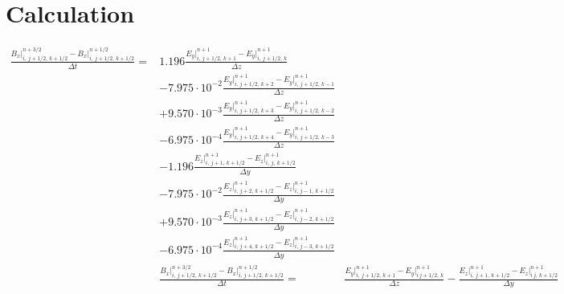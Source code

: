 \documentclass[bachelor_thesis]{subfiles}
\begin{document}
\appendix
\chapter{Calculation} \label{chap:numMaxwell}
\begin{align}
\frac{{B}_x\rvert_{i,\, j+1/2,\, k+1/2}^{n+3/2} - {B}_x\rvert_{i,\, j+1/2,\, k+1/2}^{n+1/2}}{\Delta t}
	 =& 1.196 \frac{{E}_y\rvert_{i,\, j+1/2,\, k+1}^{n+1} - {E}_y\rvert_{i,\, j+1/2,\, k}^{n+1}}{\Delta z}\\&
	 - 7.975\cdot 10^{-2} \frac{{E}_y\rvert_{i,\, j+1/2,\, k+2}^{n+1} - {E}_y\rvert_{i,\, j+1/2,\, k-1}^{n+1}}{\Delta z}\\&
	 + 9.570\cdot 10^{-3} \frac{{E}_y\rvert_{i,\, j+1/2,\, k+3}^{n+1} - {E}_y\rvert_{i,\, j+1/2,\, k-2}^{n+1}}{\Delta z}\\&
	 - 6.975\cdot 10^{-4} \frac{{E}_y\rvert_{i,\, j+1/2,\, k+4}^{n+1} - {E}_y\rvert_{i,\, j+1/2,\, k-3}^{n+1}}{\Delta z}\\&
	- 1.196 \frac{{E}_z\rvert_{i,\, j+1,\, k+1/2}^{n+1} - {E}_z\rvert_{i,\, j,\, k+1/2}^{n+1}}{\Delta y}\\&
	- 7.975\cdot 10^{-2} \frac{{E}_z\rvert_{i,\, j+2,\, k+1/2}^{n+1} - {E}_z\rvert_{i,\, j-1,\, k+1/2}^{n+1}}{\Delta y}\\&
	 + 9.570\cdot 10^{-3} \frac{{E}_z\rvert_{i,\, j+3,\, k+1/2}^{n+1} - {E}_z\rvert_{i,\, j-2,\, k+1/2}^{n+1}}{\Delta y}\\&
	 - 6.975\cdot 10^{-4} \frac{{E}_z\rvert_{i,\, j+4,\, k+1/2}^{n+1} - {E}_z\rvert_{i,\, j-3,\, k+1/2}^{n+1}}{\Delta y}\\&
	 
 
	\frac{{B}_x\rvert_{i,\, j+1/2,\, k+1/2}^{n+3/2} - {B}_x\rvert_{i,\, j+1/2,\, k+1/2}^{n+1/2}}{\Delta t} 
	 =& \frac{{E}_y\rvert_{i,\, j+1/2,\, k+1}^{n+1} - {E}_y\rvert_{i\, j+1/2,\, k}^{n+1}}{\Delta z}
	- \frac{{E}_z\rvert_{i,\, j+1,\, k+1/2}^{n+1} - {E}_z\rvert_{i\, j,\, k+1/2}^{n+1}}{\Delta y}
	\label{equ:derivB}
\end{align}
\end{document}
